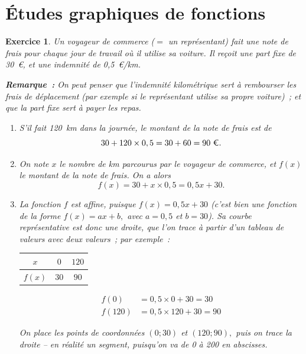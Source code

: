 \documentclass[10pt]{article}
\newtheorem{exo}{Exercice}
\begin{document}
\section{Études graphiques de fonctions}




\begin{exo}

Un voyageur de commerce ($=$ un représentant) fait une note de frais pour chaque jour de travail où il utilise sa voiture. Il reçoit une part fixe de 30~\euro, et une indemnité de 0,5~\euro/km.

\medskip

\textbf{Remarque~:} On peut penser que l'indemnité kilométrique sert à rembourser les frais de déplacement (par exemple si le représentant utilise sa propre voiture)~; et que la part fixe sert à payer les repas.

\begin{enumerate}
\item S'il fait 120~km dans la journée, le montant de la note de frais est de \[30+120\times 0,5=30+60=90~\text{\euro}.\]
\item On note $x$ le nombre de km parcourus par le voyageur de commerce, et $f(x)$ le montant de la note de frais. On a alors \[f(x)=30+x\times 0,5=0,5x+30.\]
\item La fonction $f$ est affine, puisque $f(x)=0,5x+30$ (c'est bien une fonction de la forme $f(x)=ax+b,$ avec $a=0,5$ et $b=30$). Sa courbe représentative est donc une droite, que l'on trace à partir d'un tableau de valeurs avec deux valeurs~; par exemple~:

\setlength{\columnseprule}{1pt}

\begin{multicols}{2}
\begin{center}
 \begin{tabular}{|c|c|c|}\hline
$x$& $0$ &$120$ \\ \hline 
$f(x)$&$30$ &$90$  \\ \hline
\end{tabular}
\end{center}

\begin{align*}f(0)&=0,5\times 0+30=30\\
f(120)&=0,5\times 120+30=90\end{align*}

On place les points de coordonnées $(0;30)$ et $(120;90),$ puis on trace la droite -- en réalité un segment, puisqu'on va de 0 à 200 en abscisses.


\end{multicols}
\end{enumerate}
\end{exo}
\end{document}
